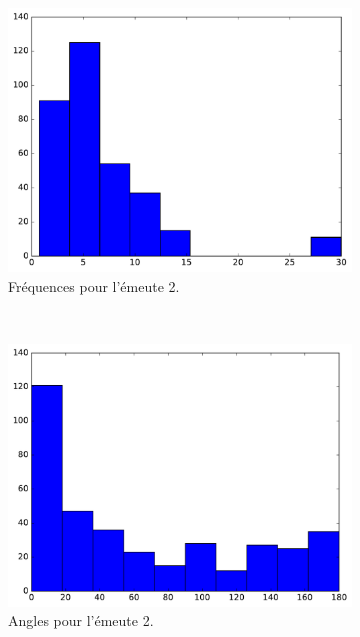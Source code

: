 \begin{figure}[!htbp]
		~
		\begin{subfigure}[t]{\subImgWclicks}
			\centering
			\includegraphics[width=\textwidth]{figures/ch3/riot2a_frequency}
			\caption{Fréquences pour l'émeute 2.}
			\label{fig:riot2a_frequency}
		\end{subfigure}
		~
		\begin{subfigure}[t]{\subImgWclicks}
			\centering
			\includegraphics[width=\textwidth]{figures/ch3/riot2a_angle}
			\caption{Angles pour l'émeute 2.}
			\label{fig:riot2a_angle}
		\end{subfigure}
		\caption[Histogrammes, émeutes]{}
		\label{fig:histRiots}
	\end{figure}

